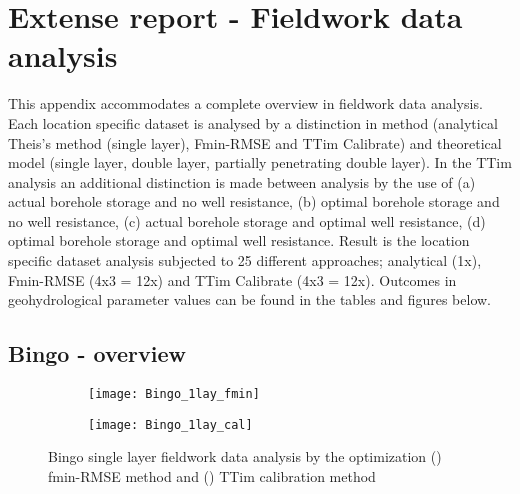 \chapter{Extense report - Fieldwork data analysis}
\label{chapter:Extense_fieldwork_analaysis}

This appendix accommodates a complete overview in fieldwork data analysis. Each location specific dataset is analysed by a distinction in method (analytical Theis's method (single layer), Fmin-RMSE and TTim Calibrate) and theoretical model (single layer, double layer, partially penetrating double layer). In the TTim analysis an additional distinction is made between analysis by the use of (a) actual borehole storage and no well resistance, (b) optimal borehole storage and no well resistance, (c) actual borehole storage and optimal well resistance, (d) optimal borehole storage and optimal well resistance. Result is the location specific dataset analysis subjected to 25 different approaches; analytical (1x), Fmin-RMSE (4x3 = 12x) and TTim Calibrate (4x3 = 12x). Outcomes in geohydrological parameter values can be found in the tables and figures below.   

\clearpage\section{Bingo - overview}
\label{sec:Bingo_overview}

\begin{figure}[h!]
	\centering
	\begin{subfigure}[b]{\linewidth}
		\centering\texttt{[image: Bingo\_1lay\_fmin]}
		\captionsetup{justification=centering}		
		\caption{\label{fig:Bingo_1lay_fmin}}
		\end{subfigure}\vfill
	\begin{subfigure}[b]{\linewidth}
		\centering\texttt{[image: Bingo\_1lay\_cal]}
		\captionsetup{justification=centering}		
		\caption{\label{fig:Bingo_1lay_cal}}
		\end{subfigure}
	\captionsetup{justification=centering}	
	\caption{Bingo single layer fieldwork data analysis by the optimization () fmin-RMSE method and () TTim calibration method} 
	\label{fig:Bingo_1lay_analysis}
\end{figure} 

